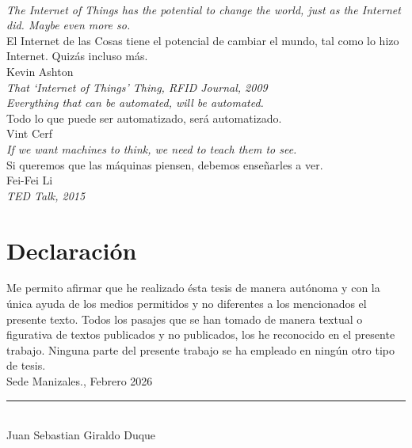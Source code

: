 \documentclass[10pt,spanish,fleqn,openany,twoside,letterpaper]{book}
\newcommand{\studentname}{}
\newcommand{\submissiondate}{}
\newcommand{\sede}{}
\renewcommand{\studentname}{Juan Sebastian Giraldo Duque}
\renewcommand{\submissiondate}{Febrero 2026}
\renewcommand{\sede}{Sede Manizales}
\begin{document}
{%
\newpage
\thispagestyle{empty}
\begin{flushright}
\begin{minipage}{12.5cm}
\noindent
\\[6em]
{\Large \textit{The Internet of Things has the potential to change the world, just as the Internet did. Maybe even more so.}}
\\[0.5em]
El Internet de las Cosas tiene el potencial de cambiar el mundo, tal como lo hizo Internet. Quizás incluso más.
\\[2em]
Kevin Ashton
\\ \textit{That `Internet of Things' Thing, RFID Journal, 2009}
\\[5em]
{\Large \textit{Everything that can be automated, will be automated.}}
\\[0.5em]
Todo lo que puede ser automatizado, será automatizado.
\\[2em]
Vint Cerf
\\[5em]
{\Large \textit{If we want machines to think, we need to teach them to see.}}
\\[0.5em]
Si queremos que las máquinas piensen, debemos enseñarles a ver.
\\[2em]
Fei-Fei Li
\\ \textit{TED Talk, 2015}
\end{minipage}
\end{flushright} 

\newpage
\chapter*{\sffamily Declaración}
\par Me permito afirmar que he realizado ésta tesis de manera autónoma y con la única ayuda de los medios permitidos y no diferentes a los mencionados el presente texto. Todos los pasajes que se han tomado de manera textual o figurativa de textos publicados y no publicados, los he reconocido en el presente trabajo. Ninguna parte del presente trabajo se ha empleado en ningún otro tipo de tesis. 
\\[1em]
\sede., \submissiondate
\\[6em]
\rule{6cm}{0.5pt}\\
\studentname
}

{\pagestyle{plain} 
\setlength{\parskip}{1mm}



\listoffigures
{}
\clearpage
\listoftables
{}
\clearpage
\tableofcontents
{}
\clearpage
}
\end{document}
